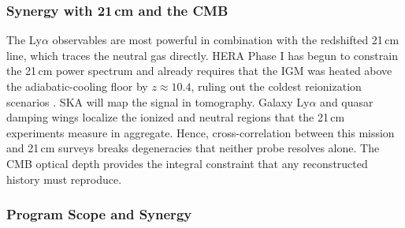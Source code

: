 \documentclass[10pt,onecolumn]{article}
\begin{document}
\subsubsection{Synergy with 21\,cm and the CMB}

The Ly$\alpha$ observables are most powerful in combination with the redshifted 21\,cm line, which traces the neutral gas directly. HERA Phase I has begun to constrain the 21\,cm power spectrum and already requires that the IGM was heated above the adiabatic-cooling floor by $z\approx10.4$, ruling out the coldest reionization scenarios \cite{hera2023}. SKA will map the signal in tomography. Galaxy Ly$\alpha$ and quasar damping wings localize the ionized and neutral regions that the 21\,cm experiments measure in aggregate. Hence, cross-correlation between this mission and 21\,cm surveys breaks degeneracies that neither probe resolves alone. The CMB optical depth \cite{planck2018} provides the integral constraint that any reconstructed history must reproduce.

\subsubsection{Program Scope and Synergy}
\end{document}
